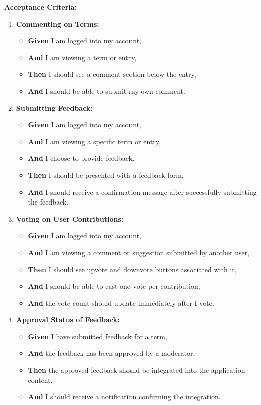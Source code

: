 \documentclass[12pt]{article}
\begin{document}
\vspace{1em}
\textbf{Acceptance Criteria:}
\begin{enumerate}
    \item \textbf{Commenting on Terms:}
    \begin{itemize}
        \item \textbf{Given} I am logged into my account,
        \item \textbf{And} I am viewing a term or entry,
        \item \textbf{Then} I should see a comment section below the entry,
        \item \textbf{And} I should be able to submit my own comment.
    \end{itemize}

    \item \textbf{Submitting Feedback:}
    \begin{itemize}
        \item \textbf{Given} I am logged into my account,
        \item \textbf{And} I am viewing a specific term or entry,
        \item \textbf{And} I choose to provide feedback,
        \item \textbf{Then} I should be presented with a feedback form,
        \item \textbf{And} I should receive a confirmation message after successfully submitting the feedback.
    \end{itemize}

    \item \textbf{Voting on User Contributions:}
    \begin{itemize}
        \item \textbf{Given} I am logged into my account,
        \item \textbf{And} I am viewing a comment or suggestion submitted by another user,
        \item \textbf{Then} I should see upvote and downvote buttons associated with it,
        \item \textbf{And} I should be able to cast one vote per contribution,
        \item \textbf{And} the vote count should update immediately after I vote.
    \end{itemize}

    \item \textbf{Approval Status of Feedback:}
    \begin{itemize}
        \item \textbf{Given} I have submitted feedback for a term,
        \item \textbf{And} the feedback has been approved by a moderator,
        \item \textbf{Then} the approved feedback should be integrated into the application content,
        \item \textbf{And} I should receive a notification confirming the integration.
    \end{itemize}


\end{enumerate}
\end{document}
